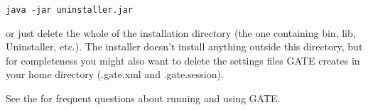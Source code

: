 \begin{small}
\begin{verbatim}
java -jar uninstaller.jar
\end{verbatim}
\end{small}

or just delete the whole of the installation directory (the one containing
bin, lib, Uninstaller, etc.). The installer doesn't install anything outside
this directory, but for completeness you might also want to delete the
settings files GATE creates in your home directory (.gate.xml and
.gate.session).


See the  for frequent questions about running and using GATE.

